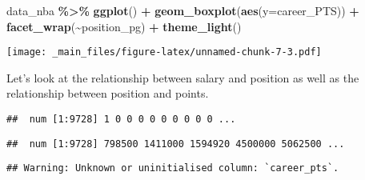 \documentclass[
]{book}
\newenvironment{Shaded}{\begin{snugshade}}{\end{snugshade}}
\newcommand{\AttributeTok}[1]{\textcolor[rgb]{0.13,0.29,0.53}{#1}}
\newcommand{\FunctionTok}[1]{\textcolor[rgb]{0.13,0.29,0.53}{\textbf{#1}}}
\newcommand{\NormalTok}[1]{#1}
\newcommand{\SpecialCharTok}[1]{\textcolor[rgb]{0.81,0.36,0.00}{\textbf{#1}}}
\begin{document}
\begin{Shaded}
\begin{Highlighting}[]
\NormalTok{data\_nba }\SpecialCharTok{\%\textgreater{}\%} \FunctionTok{ggplot}\NormalTok{() }\SpecialCharTok{+} 
\FunctionTok{geom\_boxplot}\NormalTok{(}\FunctionTok{aes}\NormalTok{(}\AttributeTok{y=}\NormalTok{career\_PTS)) }\SpecialCharTok{+}
  \FunctionTok{facet\_wrap}\NormalTok{(}\SpecialCharTok{\textasciitilde{}}\NormalTok{position\_pg) }\SpecialCharTok{+}
  \FunctionTok{theme\_light}\NormalTok{()}
\end{Highlighting}
\end{Shaded}

\texttt{[image: \_main\_files/figure-latex/unnamed-chunk-7-3.pdf]}

Let's look at the relationship between salary and position as well as the
relationship between position and points.

\begin{Shaded}
\end{Shaded}

\begin{verbatim}
##  num [1:9728] 1 0 0 0 0 0 0 0 0 0 ...
\end{verbatim}

\begin{Shaded}
\end{Shaded}

\begin{verbatim}
##  num [1:9728] 798500 1411000 1594920 4500000 5062500 ...
\end{verbatim}

\begin{Shaded}
\end{Shaded}

\begin{verbatim}
## Warning: Unknown or uninitialised column: `career_pts`.
\end{verbatim}
\end{document}
